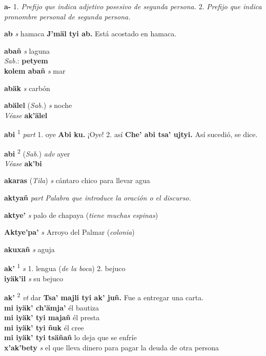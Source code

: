 \documentclass[10pt]{scrbook}
\newcommand{\entry}[1]{\textbf{#1}}
\newcommand{\maintitle}[1]{\end{multicols}\addchap{#1}\begin{multicols}{2}}
\newcommand{\alphaletter}[1]{\end{multicols}\addsec{#1}\begin{multicols}{2}}
\newcommand{\onedefinition}[1]{#1.}
\newcommand{\defsuperscript}[1]{\textsuperscript{#1}}
\newcommand{\nontranslationdef}[1]{\textit{#1}}
\newcommand{\partofspeech}[1]{\textit{#1}}
\newcommand{\spanishtranslation}[1]{#1}
\newcommand{\clarification}[1]{(\textit{#1})}
\newcommand{\cholexample}[1]{\textbf{#1}}
\newcommand{\exampletranslation}[1]{#1}
\newcommand{\dialectvariant}[1]{\\\textit{#1}:}
\newcommand{\dialectword}[1]{\textbf{#1}}
\newcommand{\alsosee}[1]{\\\textit{Véase} \textbf{#1}}
\newcommand{\relevantdialect}[1]{(\textit{#1})}
\newcommand{\secondaryentry}[1]{\\\textbf{#1}}
\newcommand{\secondpartofspeech}[1]{\textit{#1}}
\newcommand{\secondtranslation}[1]{#1}
\begin{document}
\tableofcontents

\begin{multicols}{2}


\maintitle{CH'OL — ESPAÑOL}
\alphaletter{A}

\entry{a-}
\onedefinition{1}
\nontranslationdef{Prefijo que indica adjetivo posesivo de segunda persona.}
\onedefinition{2}
\nontranslationdef{Prefijo que indica pronombre personal de segunda persona.}

\entry{ab}
\partofspeech{s}
\spanishtranslation{hamaca}
\cholexample{J'mäl tyi ab.}
\exampletranslation{Está acostado en hamaca.}

\entry{abañ}
\partofspeech{s}
\spanishtranslation{laguna}
\dialectvariant{Sab.}
\dialectword{petyem}
\secondaryentry{kolem abañ}
\secondpartofspeech{s}
\secondtranslation{mar}

\entry{abäk}
\partofspeech{s}
\spanishtranslation{carbón}

\entry{abälel}
\relevantdialect{Sab.}
\partofspeech{s}
\spanishtranslation{noche}
\alsosee{ak'älel}

\entry{abi}
\defsuperscript{1}
\partofspeech{part}
\onedefinition{1}
\spanishtranslation{oye}
\cholexample{Abi ku.}
\exampletranslation{¡Oye!}
\onedefinition{2}
\spanishtranslation{así}
\cholexample{Che' abi tsa' ujtyi.}
\exampletranslation{Así sucedió, se dice.}

\entry{abi}
\defsuperscript{2}
\relevantdialect{Sab.}
\partofspeech{adv}
\spanishtranslation{ayer}
\alsosee{ak'bi}

\entry{akaras}
\relevantdialect{Tila}
\partofspeech{s}
\spanishtranslation{cántaro chico para llevar agua}

\entry{aktyañ}
\partofspeech{part}
\nontranslationdef{Palabra que introduce la oración o el discurso.}

\entry{aktye'}
\partofspeech{s}
\spanishtranslation{palo de chapaya}
\clarification{tiene muchas espinas}

\entry{Aktye'pa'}
\partofspeech{s}
\spanishtranslation{Arroyo del Palmar}
\clarification{colonia}

\entry{akuxañ}
\partofspeech{s}
\spanishtranslation{aguja}

\entry{ak'}
\defsuperscript{1}
\partofspeech{s}
\onedefinition{1}
\spanishtranslation{lengua}
\clarification{de la boca}
\onedefinition{2}
\spanishtranslation{bejuco}
\secondaryentry{iyäk'il}
\secondpartofspeech{s}
\secondtranslation{su bejuco}

\entry{ak'}
\defsuperscript{2}
\partofspeech{vt}
\spanishtranslation{dar}
\cholexample{Tsa' majli tyi ak' juñ.}
\exampletranslation{Fue a entregar una carta.}
\secondaryentry{mi iyäk' ch'ämja'}
\secondtranslation{él bautiza}
\secondaryentry{mi iyäk' tyi majañ}
\secondtranslation{él presta}
\secondaryentry{mi iyäk' tyi ñuk}
\secondtranslation{él cree}
\secondaryentry{mi iyäk' tyi tsäñañ}
\secondtranslation{lo deja que se enfríe}
\secondaryentry{x'ak'bety}
\secondpartofspeech{s}
\secondtranslation{el que lleva dinero para pagar la deuda de otra persona}


\end{multicols}
\end{document}
